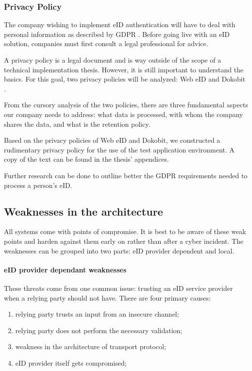 \subsubsection{Privacy Policy}

The company wishing to implement eID authentication will have to deal with personal information as described by GDPR \cite{eulaw-gdpr}. Before going live with an eID solution, companies must first consult a legal professional for advice.

A privacy policy is a legal document and is way outside of the scope of a technical implementation thesis. However, it is still important to understand the basics. For this goal, two privacy policies will be analyzed: Web eID \cite{legal-webeid-privacypolicy} and Dokobit \cite{legal-dokobit-privacypolicy}.

From the cursory analysis of the two policies, there are three fundamental aspects our company needs to address: what data is processed, with whom the company shares the data, and what is the retention policy.

Based on the privacy policies of Web eID and Dokobit, we constructed a rudimentary privacy policy for the use of the test application environment. A copy of the text can be found in the thesis' appendices.

Further research can be done to outline better the GDPR requirements needed to process a person's eID.

\subsection{Weaknesses in the architecture}

All systems come with points of compromise. It is best to be aware of these weak points and harden against them early on rather than after a cyber incident. The weaknesses can be grouped into two parts: eID provider dependent and local.

\paragraph{eID provider dependant weaknesses}

These threats come from one common issue: trusting an eID service provider when a relying party should not have. There are four primary causes:

\begin{enumerate}
  \item relying party trusts an input from an insecure channel;
  \item relying party does not perform the necessary validation;
  \item weakness in the architecture of transport protocol;
  \item eID provider itself gets compromised;
\end{enumerate}

